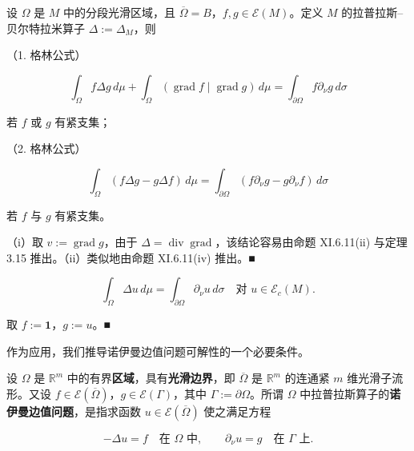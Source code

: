 \begin{theorem}

设 $ \Omega $ 是 $ M $ 中的分段光滑区域，且 $ \overline{\Omega} = B $，$ f, g \in \mathcal{E}(M) $。定义 $ M $ 的拉普拉斯–贝尔特拉米算子 $ \Delta := \Delta_M $，则

\begin{subitems}
\item

（1. 格林公式）

\[
\int_\Omega f \Delta g\, d\mu + \int_\Omega (\operatorname{grad} f \mid \operatorname{grad} g)\, d\mu = \int_{\partial\Omega} f \partial_\nu g\, d\sigma
\]

若 $ f $ 或 $ g $ 有紧支集；

\item

（2. 格林公式）

\[
\int_\Omega (f \Delta g - g \Delta f)\, d\mu = \int_{\partial\Omega} (f \partial_\nu g - g \partial_\nu f)\, d\sigma
\]

若 $ f $ 与 $ g $ 有紧支集。

\proofhead
（i）取 $ v := \operatorname{grad} g $，由于 $ \Delta = \operatorname{div} \operatorname{grad} $，该结论容易由命题 XI.6.11(ii) 与定理 3.15 推出。（ii）类似地由命题 XI.6.11(iv) 推出。\nobreak\hspace{0.35em}■
\end{subitems}

\end{theorem}

\begin{corollary}
\[
\int_\Omega \Delta u\, d\mu = \int_{\partial\Omega} \partial_\nu u\, d\sigma \quad \text{对 } u \in \mathcal{E}_c(M).
\]

\proofhead
取 $ f := \mathbf{1} $，$ g := u $。\nobreak\hspace{0.35em}■
\end{corollary}

作为应用，我们推导诺伊曼边值问题可解性的一个必要条件。

设 $ \Omega $ 是 $ \mathbb{R}^m $ 中的有界\textbf{区域}，具有\textbf{光滑边界}，即 $ \overline{\Omega} $ 是 $ \mathbb{R}^m $ 的连通紧 $ m $ 维光滑子流形。又设 $ f \in \mathcal{E}(\overline{\Omega}) $，$ g \in \mathcal{E}(\Gamma) $，其中 $ \Gamma := \partial\Omega $。所谓 $ \Omega $ 中拉普拉斯算子的\textbf{诺伊曼边值问题}，是指求函数 $ u \in \mathcal{E}(\overline{\Omega}) $ 使之满足方程

\begin{equation}
-\Delta u = f \quad \text{在 } \Omega \text{ 中}, \qquad \partial_\nu u = g \quad \text{在 } \Gamma \text{ 上}.\tag{3.21}
\end{equation}

